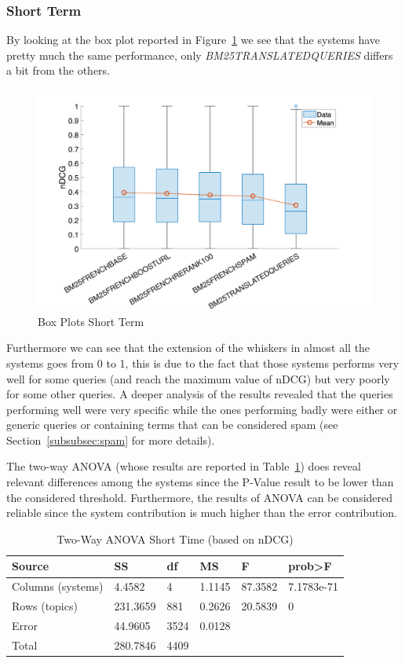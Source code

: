\subsubsection{Short Term}
\label{subsubsec:st}
By looking at the box plot reported in Figure~\ref{fig:STBP} we see that the systems have pretty much the same performance, only \textit{BM25TRANSLATEDQUERIES} differs a bit from the others.
\begin{figure}[tb]
    \centering
    \includegraphics[scale=0.5]{figure/shortterm/boxplot.png}
    \caption{Box Plots Short Term}
    \label{fig:STBP}
\end{figure}
Furthermore we can see that the extension of the whiskers in almost all the systems goes from 0 to 1, this is due to the fact that those systems performs very well for some queries (and reach the maximum value of nDCG) but very poorly for some other queries. A deeper analysis of the results revealed that the queries performing well were very specific while the ones performing badly were either or generic queries or containing terms that can be considered spam (see Section~\ref{subsubsec:spam} for more details).
\par
The two-way \ac{ANOVA} (whose results are reported in Table~\ref{tab:STANOVA}) does reveal relevant differences among the systems since the P-Value result to be lower than the considered threshold. Furthermore, the results of \ac{ANOVA} can be considered reliable since the system contribution is much higher than the error contribution.
\begin{table}[tb]
  \caption{Two-Way ANOVA Short Time (based on nDCG)}
  \label{tab:STANOVA}
  \centering
  \begin{tabular}{|l|l|l|l|l|l|}
    \toprule
    Source & SS & df & MS & F & prob>F\\
    \midrule
    Columns (systems) & 4.4582 & 4 & 1.1145 & 87.3582 & 7.1783e-71\\
    Rows (topics) & 231.3659 & 881 & 0.2626 & 20.5839 & 0\\
    Error & 44.9605 & 3524 & 0.0128 &  & \\
    Total & 280.7846 & 4409 &  &  & \\
  \bottomrule
\end{tabular}
\end{table}
